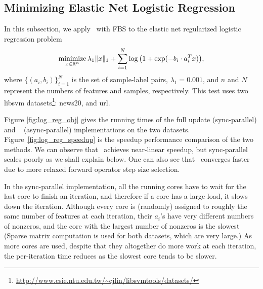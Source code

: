 \subsection{Minimizing Elastic Net Logistic Regression}
In this subsection, we apply \pkg~with FBS to the elastic net regularized logistic regression problem
\begin{equation}\label{eqn:l12_log}
\operatorname*{minimize}_{x \in \mathbb{R}^n} \lambda_1 \|x\|_1 + \sum_{i=1}^N \log\big(1 + \exp(-b_i \cdot a_i^T x)\big),
\end{equation}
where $\{(a_i, b_i)\}_{i=1}^N$ is the set of sample-label pairs, $\lambda_1=0.001$, and $n$ and $N$ represent the numbers of features and samples, respectively. This test uses two libsvm datasets\footnote{\url{http://www.csie.ntu.edu.tw/~cjlin/libsvmtools/datasets/}}: news20, and url.

Figure \ref{fig:log_reg_obj} gives the running times of  the full update (sync-parallel) and \pkg~ (async-parallel) implementations on the two datasets. Figure~\ref{fig:log_reg_speedup} is the speedup performance comparison of the two methods. We can observe that \pkg~achieves near-linear speedup, but sync-parallel scales poorly as we shall explain below. One can also see that \pkg~converges faster due to more relaxed forward operator step size selection. 

In the sync-parallel implementation,  all the running cores have to wait for the last core to finish an iteration, and therefore if a core has a large load, it slows down the iteration. Although every core is (randomly) assigned to roughly the same number of features at each iteration, their  $a_i$'s have very different numbers of nonzeros, and the core with the largest number of nonzeros is the slowest (Sparse matrix computation is used for both datasets, which are very large.) As more cores are used,  despite that they altogether do more work at each iteration, the per-iteration time reduces as the slowest core tends to be slower.


